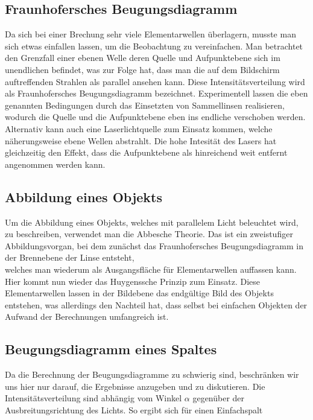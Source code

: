 \documentclass{article}
\begin{document}
\subsection{Fraunhofersches Beugungsdiagramm}
Da sich bei einer Brechung sehr viele Elementarwellen überlagern, musste man sich etwas einfallen lassen, um die Beobachtung zu vereinfachen. Man betrachtet den Grenzfall einer ebenen Welle deren Quelle und Aufpunktebene sich im unendlichen befindet, was zur Folge hat, dass man die auf dem Bildschirm auftreffenden Strahlen als parallel ansehen kann. Diese Intensitätsverteilung wird als Fraunhofersches Beugungsdiagramm bezeichnet.
Experimentell lassen die eben genannten Bedingungen durch das Einsetzten von Sammellinsen realisieren, wodurch die Quelle und die Aufpunktebene eben ins endliche verschoben werden. Alternativ kann auch eine Laserlichtquelle zum Einsatz kommen, welche näherungsweise ebene Wellen abstrahlt. Die hohe Intesität des Lasers hat gleichzeitig den Effekt, dass die Aufpunktebene als hinreichend weit entfernt angenommen werden kann.\\

\subsection{Abbildung eines Objekts}
Um die Abbildung eines Objekts, welches mit parallelem Licht beleuchtet wird, zu beschreiben, verwendet man die {\sc Abbesche Theorie}.
Das ist ein zweistufiger Abbildungsvorgan, bei dem zunächst das {\sc Fraunhofersches Beugungsdiagramm} in der Brennebene der Linse entsteht,\\
welches man wiederum als Ausgangsfläche für Elementarwellen auffassen kann. Hier kommt nun wieder das {\sc Huygenssche Prinzip} zum Einsatz. Diese Elementarwellen lassen in der Bildebene das endgültige Bild des Objekts entstehen, was allerdings den Nachteil hat, dass selbst bei einfachen Objekten der Aufwand der Berechnungen umfangreich ist.\\

\subsection{Beugungsdiagramm eines Spaltes}
Da die Berechnung der Beugungsdiagramme zu schwierig sind, beschränken wir uns hier nur darauf, die Ergebnisse anzugeben und zu diskutieren. Die Intensitätsverteilung sind abhängig vom Winkel \(\alpha\) gegenüber der Ausbreitungsrichtung des Lichts. So ergibt sich für einen Einfachspalt
\end{document}
